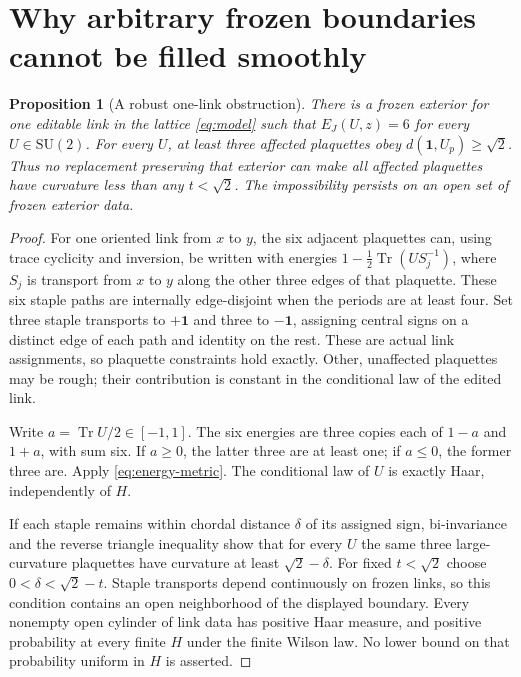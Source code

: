 \documentclass[11pt]{article}
\newtheorem{proposition}[theorem]{Proposition}
\theoremstyle{definition}
\theoremstyle{remark}
\newcommand{\Tr}{\operatorname{Tr}}
\newcommand{\one}{\mathbf1}
\newcommand{\SU}{\mathrm{SU}(2)}
\begin{document}
\section{Why arbitrary frozen boundaries cannot be filled smoothly}
\begin{proposition}[A robust one-link obstruction]\label{prop:obstruction}
There is a frozen exterior for one editable link in the lattice
\eqref{eq:model} such that $E_J(U,z)=6$ for every $U\in\SU$.
For every $U$, at least three affected plaquettes obey
$d(\one,U_p)\ge\sqrt2$. Thus no replacement preserving that exterior can
make all affected plaquettes have curvature less than any $t<\sqrt2$.
The impossibility persists on an open set of frozen exterior data.
\end{proposition}
\begin{proof}
For one oriented link from $x$ to $y$, the six adjacent plaquettes can,
using trace cyclicity and inversion, be written with energies
$1-\tfrac12\Tr(U S_j^{-1})$, where $S_j$ is transport from $x$ to $y$
along the other three edges of that plaquette. These six staple paths
are internally edge-disjoint when the periods are at least four.
Set three staple transports to $+\one$ and three to $-\one$, assigning
central signs on a distinct edge of each path and identity on the rest.
These are actual link assignments, so plaquette constraints hold exactly.
Other, unaffected plaquettes may be rough; their contribution is constant
in the conditional law of the edited link.

Write $a=\Tr U/2\in[-1,1]$. The six energies are three copies each of
$1-a$ and $1+a$, with sum six. If $a\ge0$, the latter three are at
least one; if $a\le0$, the former three are. Apply
\eqref{eq:energy-metric}. The conditional law of $U$ is exactly Haar,
independently of $H$.

If each staple remains within chordal distance $\delta$ of its assigned
sign, bi-invariance and the reverse triangle inequality show that for
every $U$ the same three large-curvature plaquettes have curvature at
least $\sqrt2-\delta$. For fixed $t<\sqrt2$ choose
$0<\delta<\sqrt2-t$. Staple transports depend continuously on frozen
links, so this condition contains an open neighborhood of the displayed
boundary. Every nonempty open cylinder of link data has positive Haar
measure, and positive probability at every finite $H$ under the finite
Wilson law. No lower bound on that probability uniform in $H$ is asserted.
\end{proof}
\end{document}
